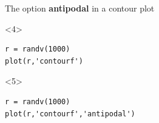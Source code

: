 \documentclass[compress]{beamer}
\begin{document}
\begin{frame}[fragile]
\begin{columns}
\begin{column}{8.5cm}
\begin{overlayarea}{8.5cm}{8cm}
The option \textbf{antipodal} in a contour plot
\begin{onlyenv}<4>
\begin{lstlisting}[style=input]
r = randv(1000)
plot(r,'contourf')
\end{lstlisting}
\end{onlyenv}
\begin{onlyenv}<5>
\begin{lstlisting}[style=input]
r = randv(1000)
plot(r,'contourf','antipodal')
\end{lstlisting}
\end{onlyenv}
\end{overlayarea}
\end{column}
  \begin{column}{3.5cm}
  \end{column}
\end{columns}



\end{frame}
\end{document}
